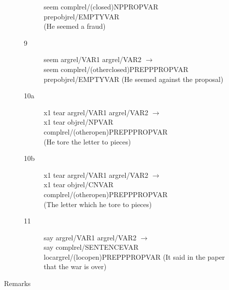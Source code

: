 \begin{description}
\begin{description}
\begin{description}
seem    complrel/(closed)NPPROPVAR prepobjrel/EMPTYVAR \\
(He seemed a fraud)
  \item[9] seem argrel/VAR1 argrel/VAR2 $\rightarrow$ \\
seem    complrel/(otherclosed)PREPPPROPVAR prepobjrel/EMPTYVAR
(He seemed against the proposal)
  \item[10a] x1 tear argrel/VAR1 argrel/VAR2 $\rightarrow$ \\
x1 tear    objrel/NPVAR complrel/(otheropen)PREPPPROPVAR \\
(He tore the letter to pieces)
  \item[10b] x1 tear argrel/VAR1 argrel/VAR2 $\rightarrow$ \\
x1 tear     objrel/CNVAR complrel/(otheropen)PREPPPROPVAR \\
(The letter which he tore to pieces)
  \item[11] say argrel/VAR1 argrel/VAR2 $\rightarrow$ \\
say    complrel/SENTENCEVAR locargrel/(locopen)PREPPPROPVAR 
(It said in the paper that the war is over)
  \end{description}
\item[Remarks]
\end{description}


\end{description}

